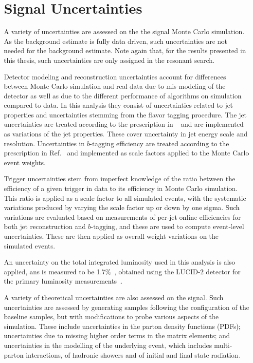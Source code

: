 \FloatBarrier
\section{Signal Uncertainties}%
\label{sec:modelling-uncerts}
A variety of uncertainties are assessed on the the signal Monte Carlo simulation.  
As the background estimate is fully data driven, such uncertainties are not needed for 
the background estimate. Note again that, for the results presented in this thesis, such uncertainties 
are only assigned in the resonant search.

Detector modeling and reconstruction uncertainties account for differences 
between Monte Carlo simulation and real data due to mis-modeling of the detector
as well as due to the different performance of algorithms on simulation compared to data. 
In this analysis they consist of uncertainties related to jet properties and uncertainties stemming 
from the flavor tagging procedure. The jet uncertainties are treated according to the prescription in 
~\cite{JETM-2018-05} and are implemented as variations of the jet properties. These cover 
uncertainty in jet energy scale and resolution. Uncertainties in $b$-tagging efficiency are 
treated according to the prescription in Ref.~\cite{FTAG-2018-01} and implemented 
as scale factors applied to the Monte Carlo event weights.

Trigger uncertainties stem from imperfect knowledge of the ratio between the
efficiency of a given trigger in data to its efficiency in Monte Carlo
simulation. This ratio is applied as a scale factor to all simulated events, with the 
systematic variations produced by varying the scale factor up or down by one sigma.
Such variations are evaluated based on measurements of per-jet online efficiencies for both jet reconstruction 
and $b$-tagging, and these are used to compute event-level uncertainties.
These are then applied as overall weight variations on the simulated events.

An uncertainty on the total integrated luminosity used in this analysis is also applied, 
ans is measured to be 1.7\%~\cite{ATLAS-CONF-2019-021}, obtained using the LUCID-2 detector for 
the primary luminosity measurements~\cite{Avoni:2633501}.

A variety of theoretical uncertainties are also assessed on the signal. Such uncertainties 
are assessed by generating samples following the configuration of the baseline samples,
but with modifications to probe various aspects of the simulation. These include
uncertainties in the parton density functions (PDFs); uncertainties due to
missing higher order terms in the matrix elements; and uncertainties in the
modelling of the underlying event, which includes multi-parton interactions, of
hadronic showers and of initial and final state radiation. 

